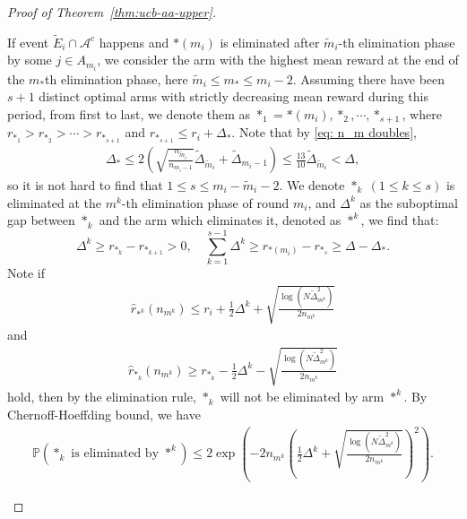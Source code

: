 \documentclass[11pt]{article}
\begin{document}
\begin{proof}[Proof of Theorem~\ref{thm:ucb-aa-upper}]
\begin{itemize}
If event $\tilde{E}_i\cap\mathcal{A}^c$ happens and $*(m_i)$ is eliminated after $\tilde{m}_i$-th elimination phase by some $j\in A_{m_i}$, we consider the arm with the highest mean reward at the end of the $m_*$th elimination phase, here $\tilde{m}_i\leq m_*\leq m_i-2$. Assuming there have been $s+1$ distinct optimal arms with strictly decreasing mean reward during this period, from first to last, we denote them as $*_1=*(m_i),*_2,\cdots, *_{s+1}$, where $r_{*_1}>r_{*_2}>\cdots> r_{*_{s+1}}$ and $r_{*_{s+1}}\leq r_i+\Delta_*$. Note that by \eqref{eq: n_m doubles},
\begin{align*}
    \Delta_*\leq2\left(\sqrt{\frac{n_{\tilde{m}_i}}{n_{m_i-1}}}\tilde{\Delta}_{\tilde{m}_i}+\tilde{\Delta}_{m_i-1}\right)\leq \frac{13}{10}\tilde{\Delta}_{\tilde{m}_i}< \Delta,
\end{align*}
so it is not hard to find that $1\leq s\leq m_i-\tilde{m}_i-2$. We denote $*_k\;(1\leq k\leq s)$ is eliminated at the $m^k$-th elimination phase of round $m_i$, and $\Delta^k$ as the suboptimal gap between $*_k$ and the arm which eliminates it, denoted as $*^k$, we find that:
\[\Delta^k\geq r_{*_{k}}-r_{*_{k+1}}>0,\quad \sum _{k=1}^{s-1}\Delta^k\geq r_{*(m_i)}-r_{*_s}\geq \Delta-\Delta_*.\]
Note if
\begin{align*}
    \hat{r}_{*^k}(n_{m^k}) \leq r_i +\frac{1}{2}\Delta^k +\sqrt{\frac{\log(N \tilde{\Delta}_{m^k}^2)}{2n_{m^k}}} 
\end{align*}
and  
\begin{align*}
    \hat{r}_{*_k}(n_{m^k}) \geq r_{*_k} -\frac{1}{2}\Delta^k-\sqrt{\frac{\log(N \tilde{\Delta}_{m^k}^2)}{2n_{m^k}}} 
\end{align*}
hold, then by the elimination rule, $*_k$ will not be eliminated by arm $*^k$. By Chernoff-Hoeffding bound, we have
\begin{align*}
\mathbb{P}\left(\text{$*_k$ is eliminated by $*^k$} \right)\leq 2\exp\left(-2n_{m^k}\left(\frac{1}{2}\Delta^k +\sqrt{\frac{\log(N \tilde{\Delta}_{m^k}^2)}{2n_{m^k}}}\right)^2\right).
\end{align*}


\end{itemize}
\end{proof}
\end{document}
